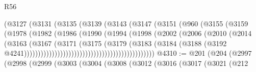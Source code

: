 \begin{lexlean}{R56}
\begin{coremodule}
                                        (@3127
                                          (@3131
                                            (@3135
                                              (@3139
                                                (@3143
                                                  (@3147
                                                    (@3151
                                                      (@960
                                                        (@3155
                                                          (@3159
                                                            (@1978
                                                              (@1982
                                                                (@1986
                                                                  (@1990
                                                                    (@1994
                                                                      (@1998
                                                                        (@2002
                                                                          (@2006
                                                                            (@2010
                                                                              (@2014
                                                                                (@3163
                                                                                  (@3167
                                                                                    (@3171
                                                                                      (@3175
                                                                                        (@3179
                                                                                          (@3183
                                                                                            (@3184
                                                                                              (@3188
                                                                                                (@3192
                                                                                                  @4241)))))))))))))))))))))))))))))))))))))))))))))))
@4310 := @201
    (@204
      (@2997
        (@2998
          (@2999
            (@3003
              (@3004
                (@3008
                  (@3012
                    (@3016
                      (@3017
                        (@3021
                          (@212

\end{coremodule}
\end{lexlean}
